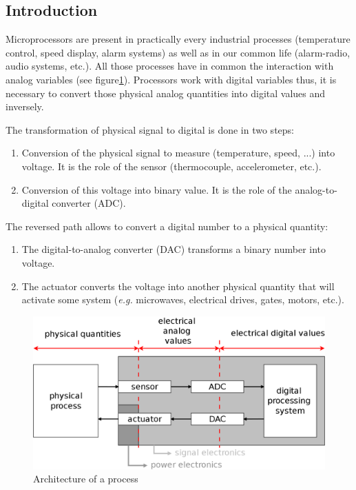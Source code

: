 \documentclass[11pt,a4paper]{article}
\theoremstyle{definition}%
\begin{document}
\subsection{Introduction}
Microprocessors are present in practically every industrial processes (temperature control, speed display, alarm systems) as well as in our common life (alarm-radio, audio systems, etc.).
All those processes have in common the interaction with analog variables (see figure\ref{fig:arch-processus}).
Processors work with digital variables thus, it is necessary to convert those physical analog quantities into digital values and inversely.

The transformation of physical signal to digital is done in two steps:
\begin{enumerate}
	\item Conversion of the physical signal to measure (temperature, speed, ...) into voltage. It is the role of the sensor (thermocouple, accelerometer, etc.).
	\item Conversion of this voltage into binary value. It is the role of the analog-to-digital converter (ADC).
\end{enumerate}

The reversed path allows to convert a digital number to a physical quantity:
\begin{enumerate}
	\item The digital-to-analog converter (DAC) transforms a binary number into voltage.
	\item The actuator converts the voltage into another physical quantity that will activate some system (\textit{e.g.} microwaves, electrical drives, gates, motors, etc.).
\end{enumerate}

\begin{figure}[H]
	\includegraphics[width=\textwidth]{ENarch-processus}
	\caption{Architecture of a process}
	\label{fig:arch-processus}
\end{figure}
\end{document}

